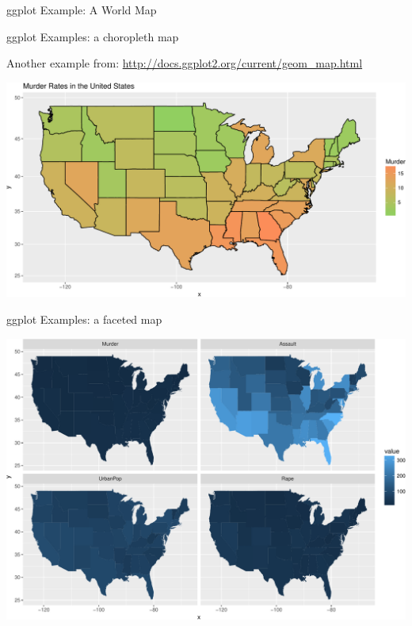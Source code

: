 \documentclass[10pt,ignorenonframetext,]{beamer}
\begin{document}
\begin{frame}[fragile]{ggplot Example: A World Map}
\normalsize

\end{frame}

\begin{frame}{ggplot Examples: a choropleth map}

Another example from:
\url{http://docs.ggplot2.org/current/geom_map.html}

\begin{center}\includegraphics[width=1\linewidth]{SpatialDataLecture_files/figure-beamer/unnamed-chunk-42-1} \end{center}

\end{frame}

\begin{frame}{ggplot Examples: a faceted map}

\begin{center}\includegraphics[width=1\linewidth]{SpatialDataLecture_files/figure-beamer/unnamed-chunk-43-1} \end{center}

\end{frame}
\end{document}
